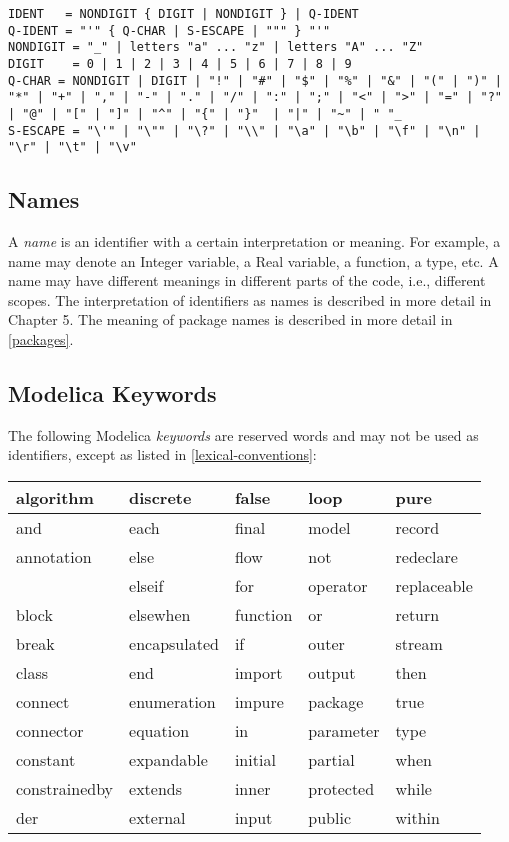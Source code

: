 \begin{lstlisting}[language=grammar]
IDENT   = NONDIGIT { DIGIT | NONDIGIT } | Q-IDENT
Q-IDENT = "'" { Q-CHAR | S-ESCAPE | """ } "'"
NONDIGIT = "_" | letters "a" ... "z" | letters "A" ... "Z"
DIGIT    = 0 | 1 | 2 | 3 | 4 | 5 | 6 | 7 | 8 | 9
Q-CHAR = NONDIGIT | DIGIT | "!" | "#" | "$" | "%" | "&" | "(" | ")" | "*" | "+" | "," | "-" | "." | "/" | ":" | ";" | "<" | ">" | "=" | "?" | "@" | "[" | "]" | "^" | "{" | "}"  | "|" | "~" | " "_
S-ESCAPE = "\'" | "\"" | "\?" | "\\" | "\a" | "\b" | "\f" | "\n" | "\r" | "\t" | "\v"
\end{lstlisting}

\subsection{Names}

A \emph{name} is an identifier with a certain interpretation or meaning.
For example, a name may denote an Integer variable, a Real variable, a
function, a type, etc. A name may have different meanings in different
parts of the code, i.e., different scopes. The interpretation of
identifiers as names is described in more detail in Chapter 5. The
meaning of package names is described in more detail in \ref{packages}.

\subsection{Modelica Keywords}

The following Modelica \emph{keywords} are reserved words and may not be
used as identifiers, except as listed in \ref{lexical-conventions}:

\begin{longtable}[c]{@{}lllll@{}}
algorithm & discrete & false & loop & pure\\ \hline
and & each & final & model & record\\ \hline
annotation & else & flow & not & redeclare\\ \hline
& elseif & for & operator & replaceable\\ \hline
block & elsewhen & function & or & return\\ \hline
break & encapsulated & if & outer & stream\\ \hline
class & end & import & output & then\\ \hline
connect & enumeration & impure & package & true\\ \hline
connector & equation & in & parameter & type\\ \hline
constant & expandable & initial & partial & when\\ \hline
constrainedby & extends & inner & protected & while\\ \hline
der & external & input & public & within\\ \hline
\end{longtable}


